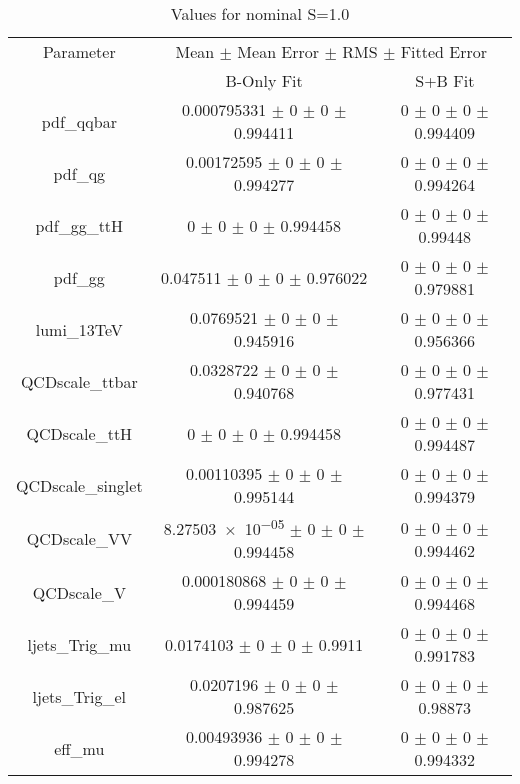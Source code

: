 \begin{table}
\centering
\caption{Values for nominal S=1.0}
\begin{tabular}{ccc}
\toprule
Parameter & \multicolumn{2}{c}{Mean $\pm$ Mean Error $\pm$ RMS $\pm$ Fitted Error}\\
 & B-Only Fit & S+B Fit\\
\midrule
pdf\_qqbar & \num{0.000795331} $\pm$ \num{0} $\pm$ \num{0} $\pm$ \num{0.994411} & \num{0} $\pm$ \num{0} $\pm$ \num{0} $\pm$ \num{0.994409}\\
pdf\_qg & \num{0.00172595} $\pm$ \num{0} $\pm$ \num{0} $\pm$ \num{0.994277} & \num{0} $\pm$ \num{0} $\pm$ \num{0} $\pm$ \num{0.994264}\\
pdf\_gg\_ttH & \num{0} $\pm$ \num{0} $\pm$ \num{0} $\pm$ \num{0.994458} & \num{0} $\pm$ \num{0} $\pm$ \num{0} $\pm$ \num{0.99448}\\
pdf\_gg & \num{0.047511} $\pm$ \num{0} $\pm$ \num{0} $\pm$ \num{0.976022} & \num{0} $\pm$ \num{0} $\pm$ \num{0} $\pm$ \num{0.979881}\\
lumi\_13TeV & \num{0.0769521} $\pm$ \num{0} $\pm$ \num{0} $\pm$ \num{0.945916} & \num{0} $\pm$ \num{0} $\pm$ \num{0} $\pm$ \num{0.956366}\\
QCDscale\_ttbar & \num{0.0328722} $\pm$ \num{0} $\pm$ \num{0} $\pm$ \num{0.940768} & \num{0} $\pm$ \num{0} $\pm$ \num{0} $\pm$ \num{0.977431}\\
QCDscale\_ttH & \num{0} $\pm$ \num{0} $\pm$ \num{0} $\pm$ \num{0.994458} & \num{0} $\pm$ \num{0} $\pm$ \num{0} $\pm$ \num{0.994487}\\
QCDscale\_singlet & \num{0.00110395} $\pm$ \num{0} $\pm$ \num{0} $\pm$ \num{0.995144} & \num{0} $\pm$ \num{0} $\pm$ \num{0} $\pm$ \num{0.994379}\\
QCDscale\_VV & \num{8.27503e-05} $\pm$ \num{0} $\pm$ \num{0} $\pm$ \num{0.994458} & \num{0} $\pm$ \num{0} $\pm$ \num{0} $\pm$ \num{0.994462}\\
QCDscale\_V & \num{0.000180868} $\pm$ \num{0} $\pm$ \num{0} $\pm$ \num{0.994459} & \num{0} $\pm$ \num{0} $\pm$ \num{0} $\pm$ \num{0.994468}\\
ljets\_Trig\_mu & \num{0.0174103} $\pm$ \num{0} $\pm$ \num{0} $\pm$ \num{0.9911} & \num{0} $\pm$ \num{0} $\pm$ \num{0} $\pm$ \num{0.991783}\\
ljets\_Trig\_el & \num{0.0207196} $\pm$ \num{0} $\pm$ \num{0} $\pm$ \num{0.987625} & \num{0} $\pm$ \num{0} $\pm$ \num{0} $\pm$ \num{0.98873}\\
eff\_mu & \num{0.00493936} $\pm$ \num{0} $\pm$ \num{0} $\pm$ \num{0.994278} & \num{0} $\pm$ \num{0} $\pm$ \num{0} $\pm$ \num{0.994332}\\

\end{tabular}
\end{table}

